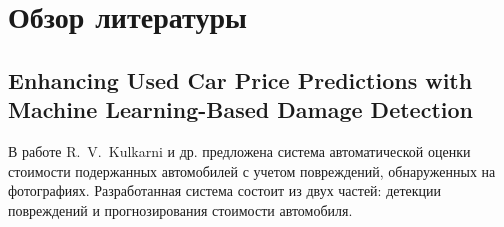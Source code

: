 \documentclass[12pt,a4paper]{article}
\begin{document}










\section{Обзор литературы}
\subsection{Enhancing Used Car Price Predictions with Machine Learning-Based Damage Detection}


В работе R.~V.~Kulkarni и др.
предложена система автоматической оценки стоимости подержанных
автомобилей с учетом повреждений, обнаруженных на фотографиях.
Разработанная система состоит из двух частей: детекции
повреждений и прогнозирования стоимости автомобиля.
\end{document}
